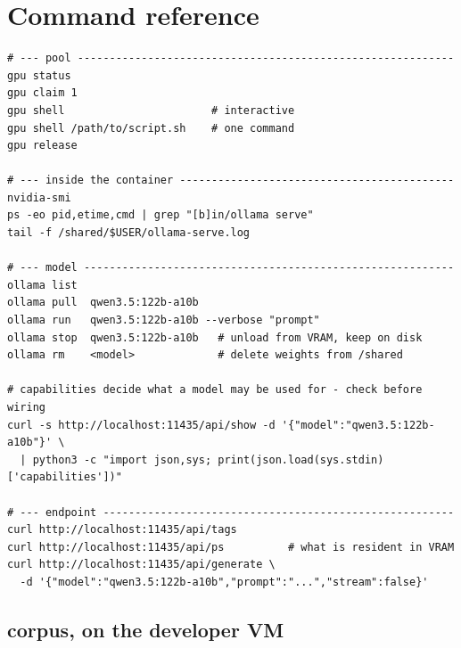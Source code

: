 \section{Command reference}
\label{sec:command-reference}

\begin{lstlisting}
# --- pool -----------------------------------------------------------
gpu status
gpu claim 1
gpu shell                       # interactive
gpu shell /path/to/script.sh    # one command
gpu release

# --- inside the container -------------------------------------------
nvidia-smi
ps -eo pid,etime,cmd | grep "[b]in/ollama serve"
tail -f /shared/$USER/ollama-serve.log

# --- model ----------------------------------------------------------
ollama list
ollama pull  qwen3.5:122b-a10b
ollama run   qwen3.5:122b-a10b --verbose "prompt"
ollama stop  qwen3.5:122b-a10b   # unload from VRAM, keep on disk
ollama rm    <model>             # delete weights from /shared

# capabilities decide what a model may be used for - check before wiring
curl -s http://localhost:11435/api/show -d '{"model":"qwen3.5:122b-a10b"}' \
  | python3 -c "import json,sys; print(json.load(sys.stdin)['capabilities'])"

# --- endpoint -------------------------------------------------------
curl http://localhost:11435/api/tags
curl http://localhost:11435/api/ps          # what is resident in VRAM
curl http://localhost:11435/api/generate \
  -d '{"model":"qwen3.5:122b-a10b","prompt":"...","stream":false}'
\end{lstlisting}

\subsection*{corpus, on the developer VM}

